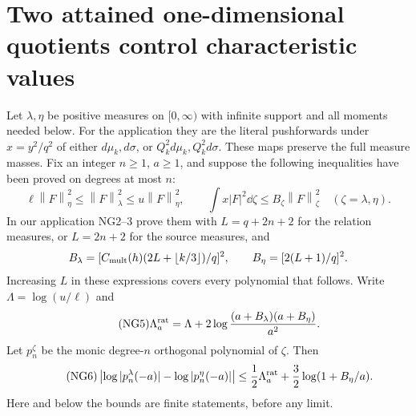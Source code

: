 \documentclass[11pt]{article}
\newcommand{\norm}[1]{\left\lVert#1\right\rVert}
\begin{document}
\section{Two attained one-dimensional quotients control characteristic values}
Let $\lambda,\eta$ be positive measures on $[0,\infty)$ with infinite
support and all moments needed below. For the application they are the
literal pushforwards under $x=y^2/q^2$ of either $d\mu_k,d\sigma$, or
$Q_k^2d\mu_k,Q_k^2d\sigma$. These maps preserve the full measure masses.
Fix an integer $n\ge1$, $a\ge1$, and suppose the following inequalities
have been proved on degrees at most $n$:
\begin{equation}\tag{NG4}
 \ell\norm F_\eta^2\le\norm F_\lambda^2\le u\norm F_\eta^2,
 \qquad \int x|F|^2\dd\zeta\le B_\zeta\norm F_\zeta^2
 \quad(\zeta=\lambda,\eta).
\end{equation}
In our application NG2--3 prove them with
$L=q+2n+2$ for the relation measures, or $L=2n+2$ for the source measures,
and
\[
 B_\lambda=[C_{\rm mult}(h)(2L+\lfloor k/3\rfloor)/q]^2,
 \qquad B_\eta=[2(L+1)/q]^2.
\]
Increasing $L$ in these expressions covers every polynomial that follows.
Write $\Lambda=\log(u/\ell)$ and
\begin{equation}\tag{NG5}
 \Lambda_a^{\rm rat}=\Lambda+
       2\log\frac{(a+B_\lambda)(a+B_\eta)}{a^2}.
\end{equation}
Let $p_n^\zeta$ be the monic degree-$n$ orthogonal polynomial of $\zeta$.
Then
\begin{equation}\tag{NG6}
 \left|\log|p_n^\lambda(-a)|-\log|p_n^\eta(-a)|\right|
 \le\frac12\Lambda_a^{\rm rat}
                   +\frac32\log(1+B_\eta/a).
\end{equation}
Here and below the bounds are finite statements, before any limit.
\end{document}
